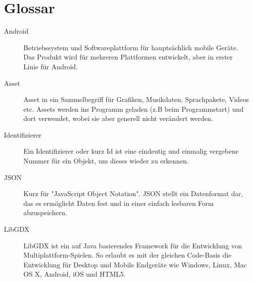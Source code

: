 \section{Glossar}
\begin{description}

\item[Android]
Betriebssystem und Softwareplattform für hauptsächlich mobile Geräte.
Das Produkt wird für mehreren Plattformen entwickelt, aber in erster Linie für Android.

\item[Asset]
Asset in ein Sammelbegriff für Grafiken, Musikdaten, Sprachpakete, Videos etc. 
Assets werden ins Programm geladen (z.B beim Programmstart) und dort verwendet, wobei sie aber generell nicht verändert werden.

\item[Identifizierer]
Ein Identifizierer oder kurz Id ist eine eindeutig und einmalig vergebene Nummer für ein Objekt, um dieses wieder zu erkennen.

\item[JSON]
Kurz für "JavaScript Object Notation". JSON stellt ein Datenformat dar, das es ermöglicht Daten fest und in einer einfach lesbaren Form abzuspeichern.

\item[LibGDX]
LibGDX ist ein auf Java basierendes Framework für die Entwicklung von Multiplattform-Spielen. So erlaubt es mit der gleichen Code-Basis die Entwicklung für Desktop und Mobile Endgeräte wie Windows, Linux, Mac OS X, Android, iOS und HTML5. 

\end{description}